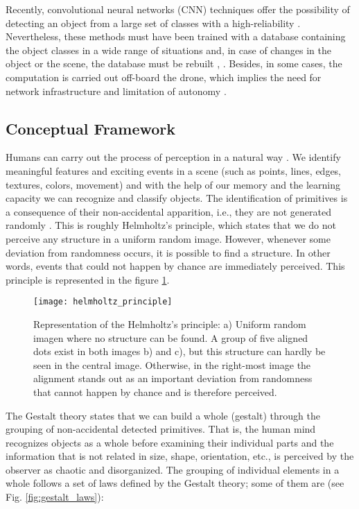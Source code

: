 Recently, convolutional neural networks (CNN) techniques offer the possibility of detecting an object from a large set of classes with a high-reliability \citep{Carrio.Sampedro.ea:JS:2017}. Nevertheless, these methods must have been trained with a database containing the object classes in a wide range of situations and, in case of changes in the object or the scene, the database must be rebuilt \citep{Yao.Yu.ea:CCC:2017}, \citep{Furukawa:TechRep:2018}. Besides, in some cases, the computation is carried out off-board the drone, which implies the need for network infrastructure and limitation of autonomy \citep{Lee.Wang.ea:IRC:2017}.

\subsection{Conceptual Framework}

Humans can carry out the process of perception in a natural way \citep{Petitot:Neurogeometrie:2008}. We identify meaningful features and exciting events in a scene (such as points, lines, edges, textures, colors, movement) and with the help of our memory and the learning capacity we can recognize and classify objects. The  identification of primitives is a consequence of their non-accidental apparition, i.e., they are not generated randomly \citep{Attneave:PR:1954}. This is roughly Helmholtz's principle, which states that we do not perceive any structure in a uniform random image. However, whenever some deviation from randomness occurs, it is possible to find a structure. In other words, events that could not happen by chance are immediately perceived. This principle is represented in the figure \ref{fig:helmholtz_principle}.


\begin{figure}[!ht]
    \centering
    \texttt{[image: helmholtz\_principle]}        
    \caption{Representation of the Helmholtz's principle: a) Uniform random imagen where no structure can be found. A group of five aligned dots exist in both images b) and c), but this structure can hardly be seen in the central image. Otherwise, in the right-most image the alignment stands out as an important deviation from randomness that cannot happen by chance and is therefore perceived.}\label{fig:helmholtz_principle}
\end{figure}


The Gestalt theory \citep{Wertheimer:Psycologische:1923} states that we can build a whole (gestalt) through the grouping of non-accidental detected primitives. That is, the human mind recognizes objects as a whole before examining their individual parts and the information that is not related in size, shape, orientation, etc., is perceived by the observer as chaotic and disorganized. The grouping of individual elements in a whole follows a set of laws defined by the Gestalt theory; some of them are (see Fig. \ref{fig:gestalt_laws}):


